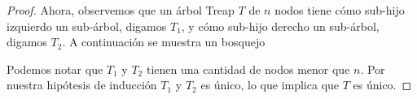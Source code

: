 \begin{proof}
Ahora, observemos que un árbol Treap $T$ de $n$ nodos tiene cómo sub-hijo izquierdo un sub-árbol,
digamos $T_1$, y cómo sub-hijo derecho un sub-árbol, digamos $T_2$. A continuación se muestra un bosquejo
\begin{center}
\end{center}

Podemos notar que $T_1$ y $T_2$ tienen una cantidad de nodos menor que $n$. Por nuestra hipótesis
de inducción $T_1$ y $T_2$ es único, lo que implica que $T$ es único.
\end{proof}


